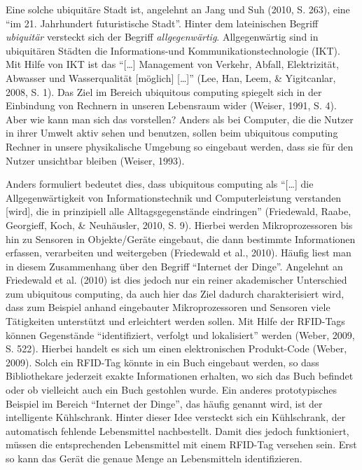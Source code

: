 \documentclass[a4paper,
fontsize=11pt,
oneside,
numbers=noperiodatend,
parskip=half-,
bibliography=totoc,
final
]{scrartcl}
\begin{document}
Eine solche ubiquitäre Stadt ist, angelehnt an Jang und Suh (2010, S.
263), eine \enquote{im 21. Jahrhundert futuristische Stadt}. Hinter dem
lateinischen Begriff \emph{ubiquitär} versteckt sich der Begriff
\emph{allgegenwärtig}. Allgegenwärtig sind in ubiquitären Städten die
Informations-und Kommunikationstechnologie (IKT). Mit Hilfe von IKT ist
das \enquote{{[}\ldots{}{]} Management von Verkehr, Abfall,
Elektrizität, Abwasser und Wasserqualität {[}möglich{]} {[}\ldots{}{]}}
(Lee, Han, Leem, \& Yigitcanlar, 2008, S. 1). Das Ziel im Bereich
ubiquitous computing spiegelt sich in der Einbindung von Rechnern in
unseren Lebensraum wider (Weiser, 1991, S. 4). Aber wie kann man sich
das vorstellen? Anders als bei Computer, die die Nutzer in ihrer Umwelt
aktiv sehen und benutzen, sollen beim ubiquitous computing Rechner in
unsere physikalische Umgebung so eingebaut werden, dass sie für den
Nutzer unsichtbar bleiben (Weiser, 1993).

Anders formuliert bedeutet dies, dass ubiquitous computing als
\enquote{{[}\ldots{}{]} die Allgegenwärtigkeit von Informationstechnik
und Computerleistung verstanden {[}wird{]}, die in prinzipiell alle
Alltagsgegenstände eindringen} (Friedewald, Raabe, Georgieff, Koch, \&
Neuhäusler, 2010, S. 9). Hierbei werden Mikroprozessoren bis hin zu
Sensoren in Objekte/Geräte eingebaut, die dann bestimmte Informationen
erfassen, verarbeiten und weitergeben (Friedewald et al., 2010). Häufig
liest man in diesem Zusammenhang über den Begriff \enquote{Internet der
Dinge}. Angelehnt an Friedewald et al. (2010) ist dies jedoch nur ein
reiner akademischer Unterschied zum ubiquitous computing, da auch hier
das Ziel dadurch charakterisiert wird, dass zum Beispiel anhand
eingebauter Mikroprozessoren und Sensoren viele Tätigkeiten unterstützt
und erleichtert werden sollen. Mit Hilfe der RFID-Tags können
Gegenstände \enquote{identifiziert, verfolgt und lokalisiert} werden
(Weber, 2009, S. 522). Hierbei handelt es sich um einen elektronischen
Produkt-Code (Weber, 2009). Solch ein RFID-Tag könnte in ein Buch
eingebaut werden, so dass Bibliothekare jederzeit exakte Informationen
erhalten, wo sich das Buch befindet oder ob vielleicht auch ein Buch
gestohlen wurde. Ein anderes prototypisches Beispiel im Bereich
\enquote{Internet der Dinge}, das häufig genannt wird, ist der
intelligente Kühlschrank. Hinter dieser Idee versteckt sich ein
Kühlschrank, der automatisch fehlende Lebensmittel nachbestellt. Damit
dies jedoch funktioniert, müssen die entsprechenden Lebensmittel mit
einem RFID-Tag versehen sein. Erst so kann das Gerät die genaue Menge an
Lebensmitteln identifizieren.
\end{document}
